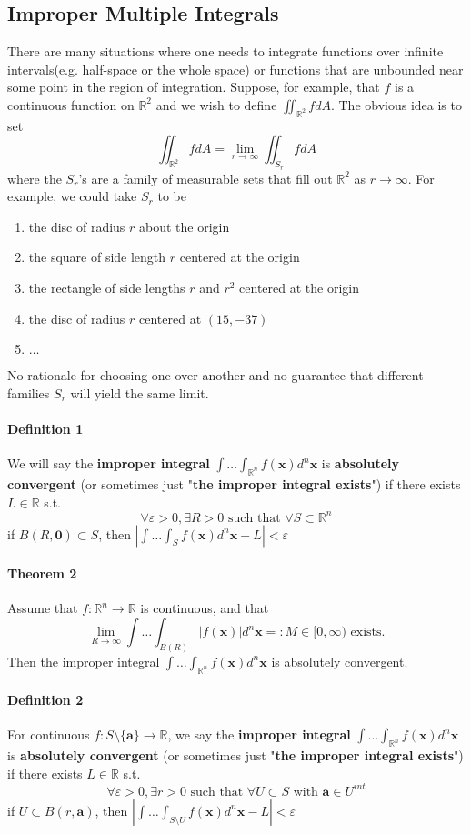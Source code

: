 \documentclass[11pt]{article}
\newcommand{\tb}[1]{\textbf{#1}}
\newcommand{\real}[0]{\mathbb{R}}
\newcommand{\vx}[0]{\tb{x}}
\newcommand{\vo}[0]{\tb{0}}
\begin{document}
\subsection{Improper Multiple Integrals}
There are many situations where one needs to integrate functions over infinite intervals(e.g. half-space or the whole space) or functions that are unbounded near some point in the region of integration. Suppose, for example, that $f$ is a continuous function on $\real^2$ and we wish to define $\iint_{\real^2}fdA$. The obvious idea is to set $$\iint_{\real^2} fdA = \underset{r\rightarrow\infty}{\lim} \iint_{S_r}fdA$$ where the $S_r$'s are a family of measurable sets that fill out $\real^2$ as $r \rightarrow \infty$. For example, we could take $S_r$ to be 
\begin{enumerate}
    \item the disc of radius $r$ about the origin
    \item the square of side length $r$ centered at the origin
    \item the rectangle of side lengths $r$ and $r^2$ centered at the origin
    \item the disc of radius $r$ centered at $(15, -37)$
    \item $\hdots$
\end{enumerate}
No rationale for choosing one over another and no guarantee that different families $S_r$ will yield the same limit.
\paragraph{Definition 1} We will say the \tb{improper integral} $\int \hdots \int_{\real^n} f(\vx)d^n\vx$ is \tb{absolutely convergent} (or sometimes just "\tb{the improper integral exists}") if there exists $L \in \real$ s.t.
$$\forall \varepsilon >0, \exists R > 0 \mbox{ such that } \forall S \subset \real^n$$
if $B(R, \vo) \subset S$, then $|\int \hdots \int_S f(\vx) d^n\vx - L| < \varepsilon$

\paragraph{Theorem 2} Assume that $f: \real^n \rightarrow \real$ is continuous, and that
$$\underset{R \rightarrow \infty}{\lim} \int \hdots \int_{B(R)} |f(\vx)|d^n\vx =: M \in [0, \infty) \mbox{ exists.}$$
Then the improper integral $\int \hdots \int_{\real^n}f(\vx)d^n\vx$ is absolutely convergent.
\paragraph{Definition 2} For continuous $f: S \setminus \{\tb{a}\} \rightarrow \real$, we say the \tb{improper integral} $\int \hdots \int_{\real^n} f(\vx)d^n\vx$ is \tb{absolutely convergent} (or sometimes just "\tb{the improper integral exists}") if there exists $L \in \real$ s.t.
$$\forall \varepsilon >0, \exists r > 0 \mbox{ such that } \forall U \subset S \mbox{ with } \tb{a} \in U^{int}$$
if $ U \subset B(r, \tb{a})$, then $|\int \hdots \int_{S\setminus U} f(\vx) d^n\vx - L| < \varepsilon$
\end{document}
